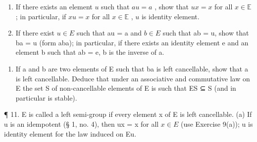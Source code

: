 \begin{enumerate}
\def\labelenumi{(\alph{enumi})}
\item
  If there exists an element \(u\) such that \(au = a\) , show that \(ux = x\) for all \(x \in \mathbb{E}\) ; in particular, if \(xu = x\) for all \(x \in \mathbb{E}\) , \(u\) is identity element.
\item
  If there exist \(u \in E\) such that au = a and \(b \in E\) such that ab = u, show that ba = u (form aba); in particular, if there exists an identity element e and an element b such that ab = e, b is the inverse of a.
\end{enumerate}

\begin{enumerate}
\def\labelenumi{\arabic{enumi}.}
\setcounter{enumi}{9}
\tightlist
\item
  If a and b are two elements of E such that ba is left cancellable, show that a is left cancellable. Deduce that under an associative and commutative law on E the set S of non-cancellable elements of E is such that ES ⊆ S (and in particular is stable).
\end{enumerate}

¶ 11. E is called a left semi-group if every element x of E is left cancellable. (a) If u is an idempotent (§ 1, no. 4), then ux = x for all \(x \in E\) (use Exercise 9(a)); u is identity element for the law induced on Eu.

